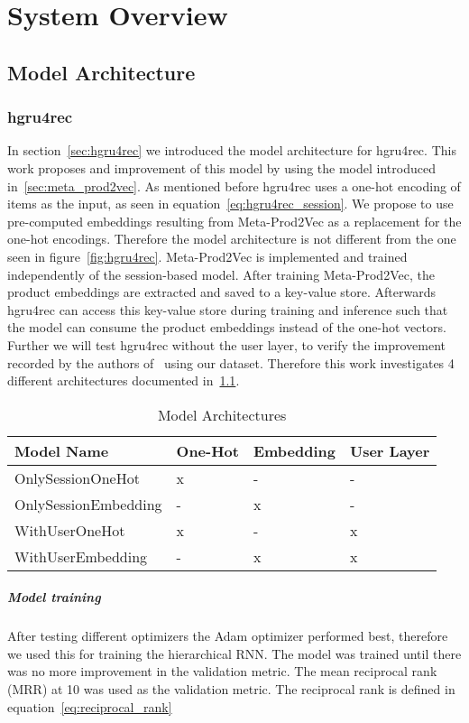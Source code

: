 \chapter{System Overview}

\section{Model Architecture}\label{sec:model_arch}
\subsection{hgru4rec}
In section~\ref{sec:hgru4rec} we introduced the model architecture for hgru4rec.
This work proposes and improvement of this model by using the model introduced in~\ref{sec:meta_prod2vec}.
As mentioned before hgru4rec uses a one-hot encoding of items as the input, as seen in equation~\ref{eq:hgru4rec_session}.
We propose to use pre-computed embeddings resulting from Meta-Prod2Vec as a replacement for the one-hot encodings.
Therefore the model architecture is not different from the one seen in figure~\ref{fig:hgru4rec}.
Meta-Prod2Vec is implemented and trained independently of the session-based model.
After training Meta-Prod2Vec, the product embeddings are extracted and saved to a key-value store.
Afterwards hgru4rec can access this key-value store during training and inference such that the model can consume the product embeddings instead of the one-hot vectors.
Further we will test hgru4rec without the user layer, to verify the improvement recorded by the authors of~\cite{hierarchical} using our dataset.
Therefore this work investigates 4 different architectures documented in~\ref{tab:model_archs}.
\begin{table}[ht]
    \centering
    \begin{tabular}{llll}\toprule
        \textbf{Model Name} & \textbf{One-Hot} & \textbf{Embedding} & \textbf{User Layer} \\ \midrule
        OnlySessionOneHot & x & - & - \\
        OnlySessionEmbedding & - & x & - \\
        WithUserOneHot & x & - & x \\
        WithUserEmbedding & - & x & x \\ \bottomrule
    \end{tabular}
    \caption{Model Architectures}
    \label{tab:model_archs}
\end{table}
\paragraph{Model training}
After testing different optimizers the Adam optimizer performed best, therefore we used this for training the hierarchical RNN.
The model was trained until there was no more improvement in the validation metric.
The mean reciprocal rank (MRR) at 10 was used as the validation metric.
The reciprocal rank is defined in equation~\ref{eq:reciprocal_rank}


